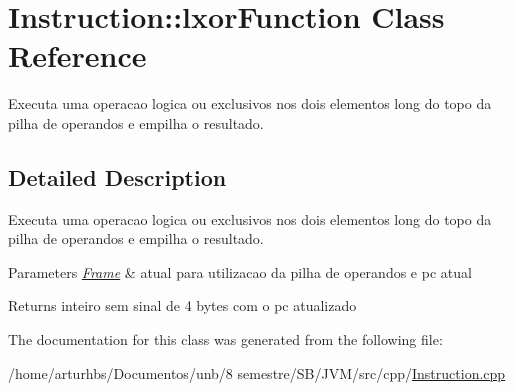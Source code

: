 \hypertarget{classInstruction_1_1lxorFunction}{}\section{Instruction\+:\+:lxor\+Function Class Reference}
\label{classInstruction_1_1lxorFunction}


Executa uma operacao logica \textquotesingle{}ou exclusivos\textquotesingle{} nos dois elementos long do topo da pilha de operandos e empilha o resultado.  




\subsection{Detailed Description}
Executa uma operacao logica \textquotesingle{}ou exclusivos\textquotesingle{} nos dois elementos long do topo da pilha de operandos e empilha o resultado. 


\begin{DoxyParams}{Parameters}
{\em \hyperlink{classFrame}{Frame}} & atual para utilizacao da pilha de operandos e pc atual \\
\hline
\end{DoxyParams}
\begin{DoxyReturn}{Returns}
inteiro sem sinal de 4 bytes com o pc atualizado 
\end{DoxyReturn}


The documentation for this class was generated from the following file\+:\begin{DoxyCompactItemize}
\item 
/home/arturhbs/\+Documentos/unb/8 semestre/\+S\+B/\+J\+V\+M/src/cpp/\hyperlink{Instruction_8cpp}{Instruction.\+cpp}\end{DoxyCompactItemize}
